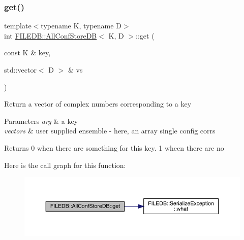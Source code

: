 \subsubsection{\texorpdfstring{get()}{get()}\hspace{0.1cm}{\footnotesize\ttfamily [2/3]}}
{\footnotesize\ttfamily template$<$typename K, typename D$>$ \\
int \mbox{\hyperlink{classFILEDB_1_1AllConfStoreDB}{F\+I\+L\+E\+D\+B\+::\+All\+Conf\+Store\+DB}}$<$ K, D $>$\+::get (\begin{DoxyParamCaption}\item[{const K \&}]{key,  }\item[{std\+::vector$<$ D $>$ \&}]{vs }\end{DoxyParamCaption})\hspace{0.3cm}{\ttfamily [inline]}}

Return a vector of complex numbers corresponding to a key 
\begin{DoxyParams}{Parameters}
{\em arg} & a key \\
\hline
{\em vectors} & user supplied ensemble -\/ here, an array single config corrs \\
\hline
\end{DoxyParams}
\begin{DoxyReturn}{Returns}
0 when there are something for this key. 1 wheen there are no 
\end{DoxyReturn}
Here is the call graph for this function\+:
\nopagebreak
\begin{figure}[H]
\begin{center}
\leavevmode
\includegraphics[width=350pt]{df/db6/classFILEDB_1_1AllConfStoreDB_a848466f7dce25cacc4e8560c50240d35_cgraph}
\end{center}
\end{figure}
\mbox{\label{classFILEDB_1_1AllConfStoreDB_a848466f7dce25cacc4e8560c50240d35}} 
